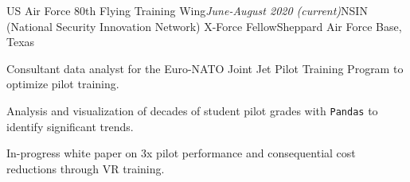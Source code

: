 \begin{rSubsection}{US Air Force 80th Flying Training Wing}{\em June-August 2020 (current)}{NSIN (National Security Innovation Network) X-Force Fellow}{Sheppard Air Force Base, Texas}
\item Consultant data analyst for the Euro-NATO Joint Jet Pilot Training Program to optimize pilot training.
\item Analysis and visualization of decades of student pilot grades with \texttt{Pandas} to identify significant trends.
\item In-progress white paper on 3x pilot performance and consequential cost reductions through VR training.
\end{rSubsection}